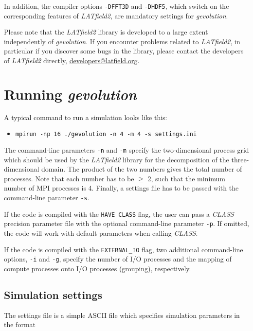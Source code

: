 \documentclass[a4paper,10pt]{article}
\begin{document}
\noindent In addition, the compiler options \texttt{-DFFT3D} and \texttt{-DHDF5}, which switch on the corresponding features of \textit{LATfield2}, are mandatory settings for \textit{gevolution}.

Please note that the \textit{LATfield2} library is developed to a large extent independently of \textit{gevolution}. If you encounter problems related to \textit{LATfield2}, in particular if you discover some bugs in the library, please contact the developers of \textit{LATfield2} directly, \url{developers@latfield.org}.


\section{Running \textit{gevolution}}

A typical command to run a simulation looks like this:

\begin{itemize}
 \item[] \texttt{mpirun -np 16 ./gevolution -n 4 -m 4 -s settings.ini} 
\end{itemize}

\noindent The command-line parameters \texttt{-n} and \texttt{-m} specify the two-dimensional process grid which should be used by the 
\textit{LATfield2} library for the decomposition of the three-dimensional domain. The product of the two numbers gives the total number of 
processes. Note that each number has to be $\geq$ 2, such that the minimum number of MPI processes is 4. Finally, a settings file has to be 
passed with the command-line parameter \texttt{-s}.

If the code is compiled with the \texttt{HAVE\_CLASS} flag, the user can pass a \textit{CLASS} precision parameter file with the optional
command-line parameter \texttt{-p}. If omitted, the code will work with default parameters when calling \textit{CLASS}.

If the code is compiled with the \texttt{EXTERNAL\_IO} flag, two additional command-line options, \texttt{-i} and \texttt{-g}, specify the 
number of I/O processes and the mapping of compute processes onto I/O processes (grouping), respectively.

\subsection{Simulation settings}

The settings file is a simple ASCII file which specifies simulation parameters in the format
\end{document}
